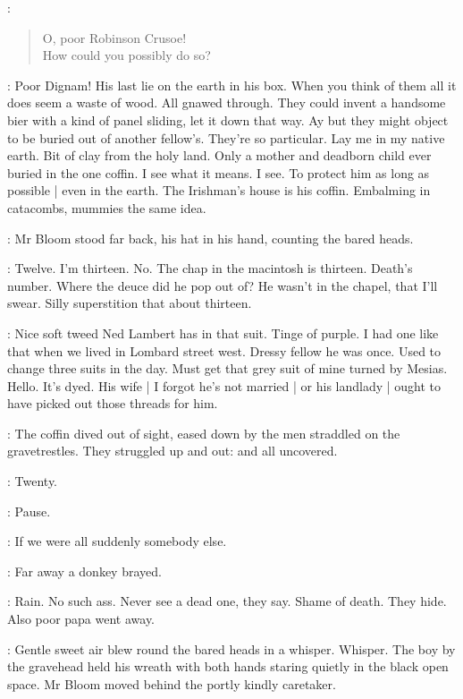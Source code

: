 \BloomInt:
\begin{verse}
    O, poor Robinson Crusoe! \\
    How could you possibly do so?
\end{verse}

\BloomInt:
Poor Dignam!
His last lie on the earth in his box.
When you think of them all
it does seem a waste of wood.
All gnawed through.
They could invent a handsome bier with a kind of panel sliding,
let it down that way.
Ay but they might object to be buried out of another fellow's.
They're so particular.
Lay me in my native earth.
Bit of clay from the holy land.
Only a mother and deadborn child ever buried in the one coffin.
I see what it means.
I see.
To protect him as long as possible |
even in the earth.
The Irishman's house is his coffin.
Embalming in catacombs, mummies the same idea.

:
Mr Bloom stood far back, his hat in his hand,
counting the bared heads.

\BloomInt:
Twelve.
I'm thirteen.
No.
The chap in the macintosh is thirteen.
Death's number.
Where the deuce did he pop out of?
He wasn't in the chapel, that I'll swear.
Silly superstition that about thirteen.

\BloomInt:
Nice soft tweed Ned Lambert has in that suit.
Tinge of purple.
I had one like that when we lived in Lombard street west.
Dressy fellow he was once.
Used to change three suits in the day.
Must get that grey suit of mine turned by Mesias.
Hello.
It's dyed.
His wife |
I forgot he's not married |
or his landlady |
ought to have picked out those threads for him.

:
The coffin dived out of sight,
eased down by the men straddled on the gravetrestles.
They struggled up and out:
and all uncovered.

\BloomInt:
Twenty.

:
Pause.

\BloomInt:
If we were all suddenly somebody else.

:
Far away a donkey brayed.

\BloomInt:
Rain.
No such ass.
Never see a dead one, they say.
Shame of death.
They hide.
Also poor papa went away.

:
Gentle sweet air blew round the bared heads in a whisper.
Whisper.
The boy by the gravehead held his wreath with both hands
staring quietly in the black open space.
Mr Bloom moved behind the portly kindly caretaker.

